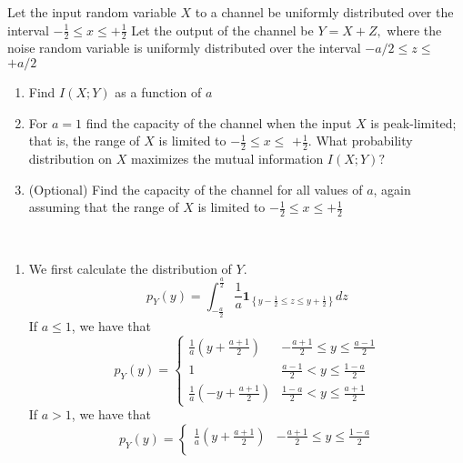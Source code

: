 \begin{exercise}{ Let the input random variable $X$ to a channel be uniformly distributed over the interval $-\frac{1}{2} \leq x \leq+\frac{1}{2}$ Let the output of the channel be $Y=X+Z,$ where the noise random variable is uniformly distributed over the interval $-a / 2 \leq z \leq$ $+a / 2$
  \begin{enumerate}
    \item Find $I(X ; Y)$ as a function of $a$
    \item For $a=1$ find the capacity of the channel when the input $X$ is peak-limited; that is, the range of $X$ is limited to $-\frac{1}{2} \leq x \leq$ $+\frac{1}{2} .$ What probability distribution on $X$ maximizes the mutual information $I(X ; Y) ?$
    \item (Optional) Find the capacity of the channel for all values of $a$, again assuming that the range of $X$ is limited to $-\frac{1}{2} \leq x \leq+\frac{1}{2}$
  \end{enumerate} }
  \begin{solution}
  \par{~}
  \begin{enumerate}
    \item We first calculate the distribution of $Y$.
    \begin{equation}
      p_Y (y) = \int_{-\frac{a}{2}}^{\frac{a}{2}} \frac{1}{a} \mathbf{1}_{\left\{ y - \frac{1}{2} \le z \le y + \frac{1}{2} \right\}} d z
    \end{equation}
    If $a\le 1$, we have that
    \begin{equation}
      p_Y (y) = \begin{cases}
        \frac{1}{a} \left( y + \frac{a+1}{2}\right)  & -\frac{a+1}{2} \le y \le \frac{a-1}{2} \\
        1 & \frac{a-1}{2} < y \le \frac{1-a}{2} \\
        \frac{1}{a} \left(-y + \frac{a+1}{2}\right) & \frac{1-a}{2} < y \le \frac{a+1}{2}
      \end{cases}
    \end{equation}
    If $a > 1$, we have that
    \begin{equation}
      p_Y (y) = \begin{cases}
        \frac{1}{a} \left( y + \frac{a+1}{2}\right)  & -\frac{a+1}{2} \le y \le \frac{1-a}{2} \\

\end{cases}
\end{equation}
\end{enumerate}
\end{solution}
\end{exercise}
